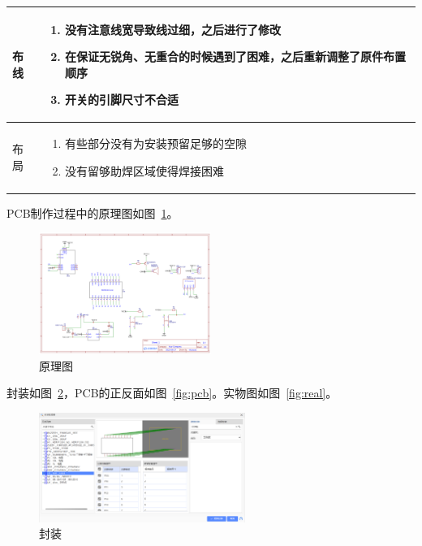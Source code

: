\documentclass[a4paper,twoside,zihao=5,UTF8]{ctexart}
\begin{document}
\begin{spacing}{1.2}
\begin{table}[htbp]
\begin{tabular}{p{4cm}|p{8cm}}
		\\
		\hline
		布线 & \begin{minipage}[t]{8cm}
			\begin{enumerate}
				\item 没有注意线宽导致线过细，之后进行了修改
				\item 在保证无锐角、无重合的时候遇到了困难，之后重新调整了原件布置顺序
				\item 开关的引脚尺寸不合适
			\end{enumerate}
		\end{minipage} 

		\\
		\hline
		布局 & \begin{minipage}[t]{8cm}
			\begin{enumerate}
				\item 有些部分没有为安装预留足够的空隙
				\item 没有留够助焊区域使得焊接困难
			\end{enumerate}
		\end{minipage} 

		\\
		\hline
		\bottomrule
	\end{tabular}
\end{table}

PCB制作过程中的原理图如图~\ref*{fig:schematic}。

\begin{figure}[H]
	\centering
	\caption{原理图}
	\label{fig:schematic}
	\includegraphics[width=0.5\textwidth]{Schematic.png}
\end{figure}

封装如图~\ref{fig:package}，PCB的正反面如图~\ref{fig:pcb}。实物图如图~\ref{fig:real}。

\begin{figure}[htbp]
	\centering
	\caption{封装}
	\label{fig:package}
	\includegraphics[width=0.6\textwidth]{package.png}
\end{figure}



\end{spacing}
\end{document}
